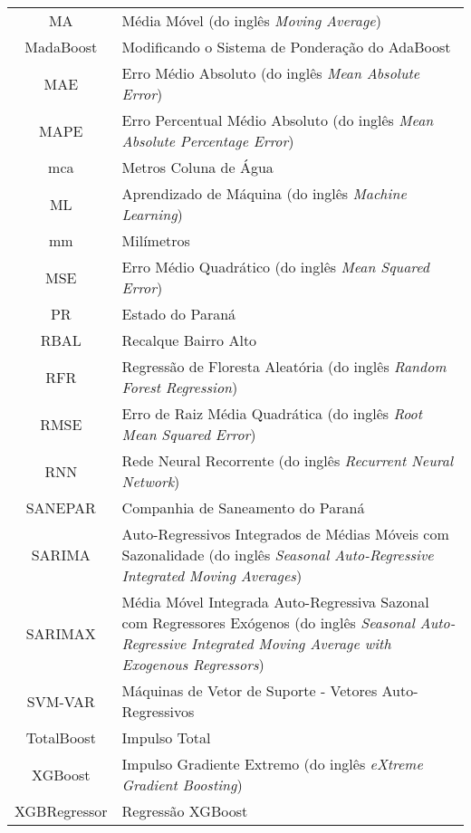 \begin{tabular}{cp{}}
	MA & Média Móvel (do inglês \textit{Moving Average})\\
	MadaBoost & Modificando o Sistema de Ponderação do AdaBoost\\
	MAE & Erro Médio Absoluto (do inglês \textit{Mean Absolute Error})\\
	MAPE & Erro Percentual Médio Absoluto (do inglês \textit{Mean Absolute Percentage Error})\\
	mca & Metros Coluna de Água\\
	ML & Aprendizado de Máquina (do inglês \textit{Machine Learning})\\
	mm & Milímetros\\
	MSE & Erro Médio Quadrático (do inglês \textit{Mean Squared Error})\\
	PR & Estado do Paraná\\
	RBAL & Recalque Bairro Alto\\
	RFR & Regressão de Floresta Aleatória (do inglês \textit{Random Forest Regression})\\
	RMSE & Erro de Raiz Média Quadrática (do inglês \textit{Root Mean Squared Error})\\
	RNN & Rede Neural Recorrente (do inglês \textit{Recurrent Neural Network})\\
	SANEPAR & Companhia de Saneamento do Paraná \\
	SARIMA & Auto-Regressivos Integrados de Médias Móveis com Sazonalidade (do inglês \textit{Seasonal Auto-Regressive Integrated Moving Averages}) \\
	SARIMAX & Média Móvel Integrada Auto-Regressiva Sazonal com Regressores Exógenos (do inglês \textit{Seasonal Auto-Regressive Integrated Moving Average with Exogenous Regressors}) \\
	SVM-VAR & Máquinas de Vetor de Suporte - Vetores Auto-Regressivos\\
	TotalBoost & Impulso Total\\
	XGBoost & Impulso Gradiente Extremo (do inglês \textit{eXtreme Gradient Boosting})\\
	XGBRegressor & Regressão XGBoost
\end{tabular}